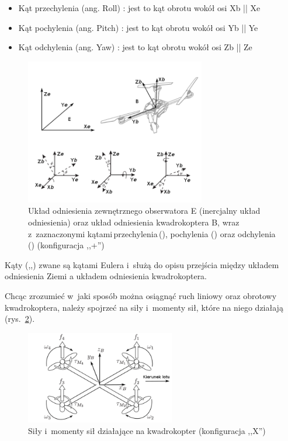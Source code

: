\documentclass[11pt, twoside]{Thesis} %
\begin{document}
\begin{itemize}
	\item Kąt przechylenia (ang. Roll) \straightphi: jest to kąt obrotu wokół osi Xb || Xe
	\item Kąt pochylenia (ang. Pitch) \straighttheta: jest to kąt obrotu wokół osi Yb || Ye 
	\item Kąt odchylenia (ang. Yaw) \textpsi: jest to kąt obrotu wokół osi Zb || Ze
\end{itemize}

\begin{figure}[!htb]
	\centering
		\includegraphics[width=0.7\textwidth]{Pictures/quadrotor_frames.png}
		\caption[Układy odniesienia]{Układ odniesienia zewnętrznego obserwatora E (inercjalny układ odniesienia) oraz układ odniesienia kwadrokoptera B, wraz z~zaznaczonymi kątami\,przechylenia\,(\straightphi), pochylenia (\straighttheta) oraz odchylenia (\textpsi) (konfiguracja ,,+'')~\cite{quadro6}}
	\label{fig:quadrotor_frames.png}
\end{figure}

Kąty (\straightphi,\straighttheta,\textpsi) zwane są kątami Eulera i~służą do opisu przejścia między układem odniesienia Ziemi a układem odniesienia kwadrokoptera.

Chcąc zrozumieć w~jaki sposób można osiągnąć ruch liniowy oraz obrotowy kwadrokoptera, należy spojrzeć na siły i~momenty sił, które na niego działają (rys.~\ref{fig:quadrotor_forces}). 

\begin{figure}[H]
	\centering
		\includegraphics[width=0.58\textwidth]{Pictures/quadrotor_forces.png}
		\caption[Siły i~momenty sił działające na kwadrokopter]{Siły i~momenty sił działające na kwadrokopter (konfiguracja ,,X'')~\cite{quadro7}}
	\label{fig:quadrotor_forces}
\end{figure}
\end{document}
